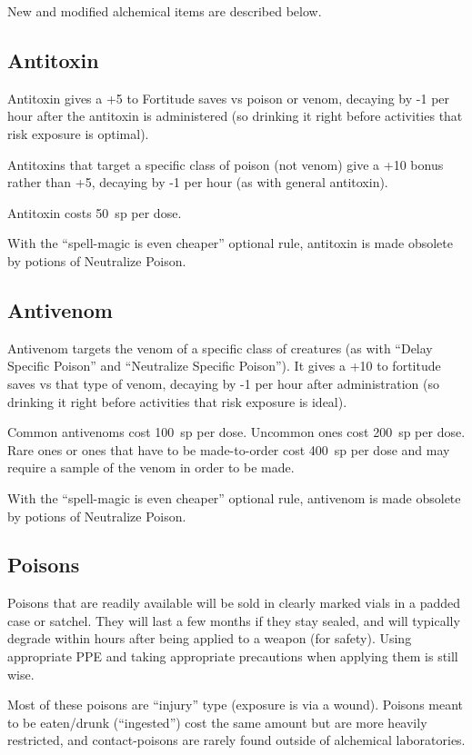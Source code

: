 New and modified alchemical items are described below.

%
\subsection{Antitoxin}

Antitoxin gives a +5 to Fortitude saves vs poison or venom, decaying by -1
per hour after the antitoxin is administered (so drinking it right before
activities that risk exposure is optimal).

Antitoxins that target a specific class of poison (not venom) give a +10
bonus rather than +5, decaying by -1 per hour (as with general antitoxin).

Antitoxin costs 50~sp per dose.

With the ``spell-magic is even cheaper'' optional rule, antitoxin is made
obsolete by potions of Neutralize Poison.
%

%
\subsection{Antivenom}

Antivenom targets the venom of a specific class of creatures (as with
``Delay Specific Poison'' and ``Neutralize Specific Poison''). It gives
a +10 to fortitude saves vs that type of venom, decaying by -1 per hour
after administration (so drinking it right before activities that risk
exposure is ideal).

Common antivenoms cost 100~sp per dose. Uncommon ones cost 200~sp per dose.
Rare ones or ones that have to be made-to-order cost 400~sp per dose and
may require a sample of the venom in order to be made.

With the ``spell-magic is even cheaper'' optional rule, antivenom is made
obsolete by potions of Neutralize Poison.
%

%
\subsection{Poisons}

Poisons that are readily available will be sold in clearly marked vials in
a padded case or satchel. They will last a few months if they stay sealed,
and will typically degrade within hours after being applied to a weapon
(for safety). Using appropriate PPE and taking appropriate precautions when
applying them is still wise.

Most of these poisons are ``injury'' type (exposure is via a wound). Poisons
meant to be eaten/drunk (``ingested'') cost the same amount but are more
heavily restricted, and contact-poisons are rarely found outside of
alchemical laboratories.

